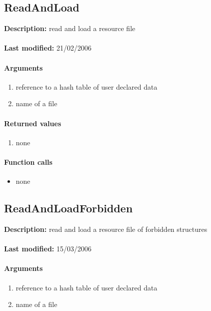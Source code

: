\subsection{ReadAndLoad}
\textbf{Description:} read and load a resource file\\
\\\textbf{Last modified:} 21/02/2006

\paragraph{Arguments}
\begin{enumerate}
\item reference to a hash table of user declared data
\item name of a file
\end{enumerate}

\paragraph{Returned values}
\begin{enumerate}
\item none
\end{enumerate}

\paragraph{Function calls}
\begin{itemize}
\item none
\end{itemize}

\subsection{ReadAndLoadForbidden}
\textbf{Description:} read and load a resource file of forbidden structures\\
\\\textbf{Last modified:} 15/03/2006

\paragraph{Arguments}
\begin{enumerate}
\item reference to a hash table of user declared data
\item name of a file
\end{enumerate}

